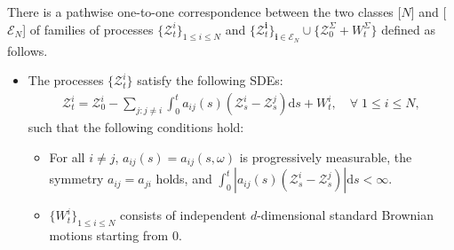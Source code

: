 \documentclass[10pt,a4paper]{amsart}
\newcommand{\bi}{\mathbf i}
\newcommand{\bs}{\boldsymbol}
\newcommand{\cc}{{^\circ}}
\renewcommand{\d}{{\mathrm d}}
\newcommand{\mc}{\mathcal}
\begin{document}
\begin{prop}
\noindent {\rm (2$\cc$)} There is a pathwise one-to-one correspondence between the two classes [$N$] and [$\mathcal E_N$] of families of processes $\{\mc Z^i_t \}_{1\leq i\leq N}$ and $\{\mathcal Z^\bi_t \}_{\bi\in\mc E_N}\cup \{\mc Z^\Sigma_0+W^\Sigma_t \}$ defined as follows.
\begin{itemize}[leftmargin=1.2cm]
\item [{\bf [$\bs N$]}] The processes $\{\mc Z^i_t \}$  satisfy the following SDEs:
\begin{align}\label{def:Zi}
\mc Z^i_t=\mc Z^i_0-\sum_{j:j\neq i}\int_0^t a_{i j}(s)(\mc Z^i_s-\mc Z^j_s)\d s+W^i_t,\quad \forall\;1\leq i\leq N,
\end{align}
such that the following conditions hold:
\begin{itemize}
\item [$\bullet$] For all $i\neq j$, $a_{ij}(s)=a_{ij}(s,\omega)$ is progressively measurable, the symmetry $a_{ij}=a_{ji}$ holds, and
$\int_0^t |a_{ij}(s)(\mc Z^i_s-\mc Z^j_s)|\d s<\infty$.
\item [$\bullet$]  $\{W^i_t \}_{1\leq i\leq N}$ consists of independent $d$-dimensional standard Brownian motions starting from $0$.
\end{itemize}


\end{itemize}
\end{prop}
\end{document}
